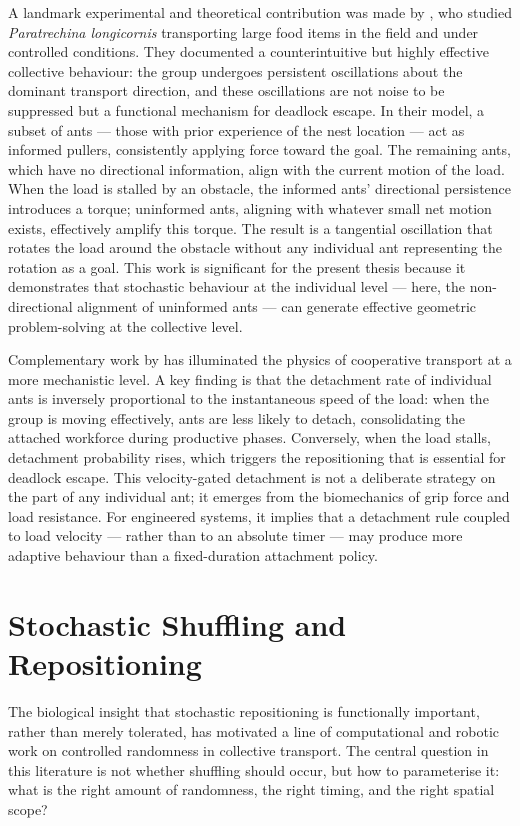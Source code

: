 A landmark experimental and theoretical contribution was made by \citet{gelblum2021}, who studied \textit{Paratrechina longicornis} transporting large food items in the field and under controlled conditions. They documented a counterintuitive but highly effective collective behaviour: the group undergoes persistent oscillations about the dominant transport direction, and these oscillations are not noise to be suppressed but a functional mechanism for deadlock escape. In their model, a subset of ants — those with prior experience of the nest location — act as informed pullers, consistently applying force toward the goal. The remaining ants, which have no directional information, align with the current motion of the load. When the load is stalled by an obstacle, the informed ants' directional persistence introduces a torque; uninformed ants, aligning with whatever small net motion exists, effectively amplify this torque. The result is a tangential oscillation that rotates the load around the obstacle without any individual ant representing the rotation as a goal. This work is significant for the present thesis because it demonstrates that stochastic behaviour at the individual level — here, the non-directional alignment of uninformed ants — can generate effective geometric problem-solving at the collective level.

Complementary work by \citet{feinerman2018} has illuminated the physics of cooperative transport at a more mechanistic level. A key finding is that the detachment rate of individual ants is inversely proportional to the instantaneous speed of the load: when the group is moving effectively, ants are less likely to detach, consolidating the attached workforce during productive phases. Conversely, when the load stalls, detachment probability rises, which triggers the repositioning that is essential for deadlock escape. This velocity-gated detachment is not a deliberate strategy on the part of any individual ant; it emerges from the biomechanics of grip force and load resistance. For engineered systems, it implies that a detachment rule coupled to load velocity — rather than to an absolute timer — may produce more adaptive behaviour than a fixed-duration attachment policy.

\section{Stochastic Shuffling and Repositioning}
\label{sec:stochastic_shuffling}

The biological insight that stochastic repositioning is functionally important, rather than merely tolerated, has motivated a line of computational and robotic work on controlled randomness in collective transport. The central question in this literature is not whether shuffling should occur, but how to parameterise it: what is the right amount of randomness, the right timing, and the right spatial scope?


